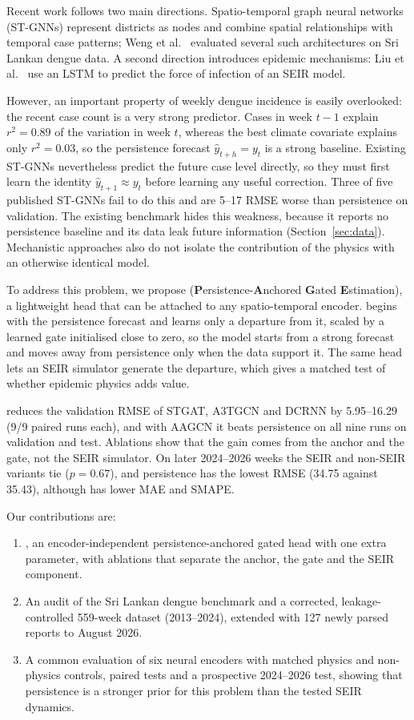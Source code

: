 Recent work follows two main directions. Spatio-temporal graph neural networks (ST-GNNs) represent districts as nodes and combine spatial relationships with temporal case patterns; Weng et al.~\cite{weng2024graph} evaluated several such architectures on Sri Lankan dengue data. A second direction introduces epidemic mechanisms: Liu et al.~\cite{liu2025seirlstm} use an LSTM to predict the force of infection of an SEIR model.

However, an important property of weekly dengue incidence is easily overlooked: the recent case count is a very strong predictor. Cases in week $t-1$ explain $r^2=0.89$ of the variation in week $t$, whereas the best climate covariate explains only $r^2=0.03$, so the persistence forecast $\hat{y}_{t+h}=y_t$ is a strong baseline. Existing ST-GNNs nevertheless predict the future case level directly, so they must first learn the identity $\hat{y}_{t+1}\approx y_t$ before learning any useful correction. Three of five published ST-GNNs fail to do this and are 5--17 RMSE worse than persistence on validation. The existing benchmark hides this weakness, because it reports no persistence baseline and its data leak future information (Section~\ref{sec:data}). Mechanistic approaches also do not isolate the contribution of the physics with an otherwise identical model.

To address this problem, we propose \model{} (\textbf{P}ersistence-\textbf{A}nchored \textbf{G}ated \textbf{E}stimation), a lightweight head that can be attached to any spatio-temporal encoder. \model{} begins with the persistence forecast and learns only a departure from it, scaled by a learned gate initialised close to zero, so the model starts from a strong forecast and moves away from persistence only when the data support it. The same head lets an SEIR simulator generate the departure, which gives a matched test of whether epidemic physics adds value.

\model{} reduces the validation RMSE of STGAT, A3TGCN and DCRNN by 5.95--16.29 (9/9 paired runs each), and with AAGCN it beats persistence on all nine runs on validation and test. Ablations show that the gain comes from the anchor and the gate, not the SEIR simulator. On later 2024--2026 weeks the SEIR and non-SEIR variants tie ($p=0.67$), and persistence has the lowest RMSE (34.75 against 35.43), although \model{} has lower MAE and SMAPE.

Our contributions are:
\begin{enumerate}
    \item \model{}, an encoder-independent persistence-anchored gated head with one extra parameter, with ablations that separate the anchor, the gate and the SEIR component.
    \item An audit of the Sri Lankan dengue benchmark and a corrected, leakage-controlled 559-week dataset (2013--2024), extended with 127 newly parsed reports to August 2026.
    \item A common evaluation of six neural encoders with matched physics and non-physics controls, paired tests and a prospective 2024--2026 test, showing that persistence is a stronger prior for this problem than the tested SEIR dynamics.
\end{enumerate}
